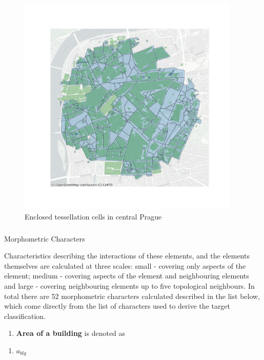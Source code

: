 \documentclass[
  letterpaper,
  DIV=11,
  numbers=noendperiod]{scrartcl}
\makeatletter
\let\oldsubparagraph\subparagraph
\renewcommand{\subparagraph}{
    \@ifstar
      \xxxSubParagraphStar
      \xxxSubParagraphNoStar
  }
\newcommand{\xxxSubParagraphStar}[1]{\oldsubparagraph*{#1}\mbox{}}
\newcommand{\xxxSubParagraphNoStar}[1]{\oldsubparagraph{#1}\mbox{}}
\providecommand{\tightlist}{%
  \setlength{\itemsep}{0pt}\setlength{\parskip}{0pt}}\usepackage{longtable,booktabs,array}
\makeatother
\begin{document}
\begin{figure}[H]

{\centering \includegraphics[width=\linewidth,height=4.16667in,keepaspectratio]{../figures/algo_design/tessellations.png}

}

\caption{Enclosed tessellation cells in central Prague}

\end{figure}%

\subparagraph{Morphometric Characters}\label{morphometric-characters}

Characteristics describing the interactions of these elements, and the
elements themselves are calculated at three scales: small - covering
only aspects of the element; medium - covering aspects of the element
and neighbouring elements and large - covering neighbouring elements up
to five topological neighbours. In total there are 52 morphometric
characters calculated described in the list below, which come directly
from the list of characters used to derive the target classification.

\begin{enumerate}
\def\labelenumi{\arabic{enumi}.}
\tightlist
\item
  \textbf{Area of a building} is denoted as
\end{enumerate}

\begin{enumerate}
\def\labelenumi{(\arabic{enumi})}
\tightlist
\item
  \(a_{blg}\)
\end{enumerate}
\end{document}
